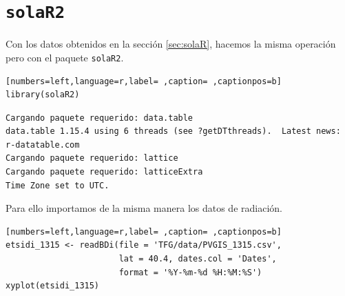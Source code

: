 \section{\texttt{solaR2}}
\label{sec:org7295038}
\label{sec:solaR2}
Con los datos obtenidos en la sección \ref{sec:solaR}, hacemos la misma operación pero con el paquete \texttt{solaR2}.
\begin{lstlisting}[numbers=left,language=r,label= ,caption= ,captionpos=b]
library(solaR2)
\end{lstlisting}

\begin{verbatim}
Cargando paquete requerido: data.table
data.table 1.15.4 using 6 threads (see ?getDTthreads).  Latest news: r-datatable.com
Cargando paquete requerido: lattice
Cargando paquete requerido: latticeExtra
Time Zone set to UTC.
\end{verbatim}


Para ello importamos de la misma manera los datos de radiación.
\begin{lstlisting}[numbers=left,language=r,label= ,caption= ,captionpos=b]
etsidi_1315 <- readBDi(file = 'TFG/data/PVGIS_1315.csv',
                       lat = 40.4, dates.col = 'Dates',
                       format = '%Y-%m-%d %H:%M:%S')
xyplot(etsidi_1315)
\end{lstlisting}

